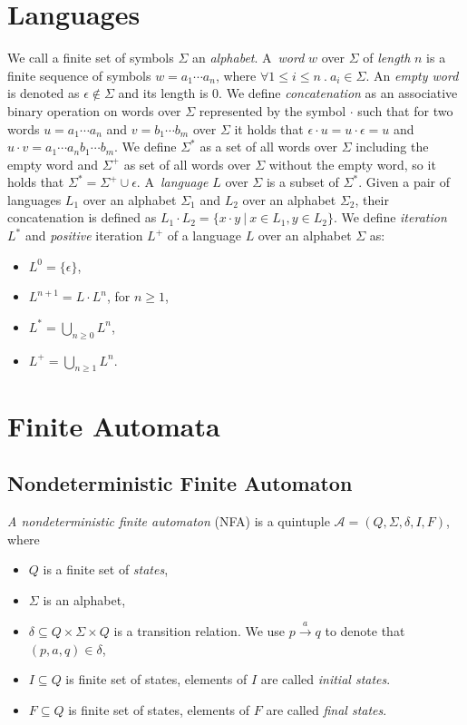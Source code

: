 \section{Languages}
We call a finite set of symbols $\Sigma$ an \emph{alphabet}. A~\emph{word} $w$ over $\Sigma$ of \emph{length} $n$ is a finite sequence of symbols 
$w=a_1\cdots a_n$, where $\forall 1 \leq i \leq n\ . \ a_i \in \Sigma$. An \emph{empty word} is denoted as $\epsilon \not\in\Sigma$ and its length is $0$. 
We define \emph{concatenation} as an associative binary operation on words over $\Sigma$ represented by the symbol $\cdot$ such that for two words 
$u=a_1\cdots a_n$
and $v=b_1\cdots b_m$ over $\Sigma$ it holds that $\epsilon\cdot u=u\cdot\epsilon=u$ and $u\cdot v=a_1 \cdots a_nb_1 \cdots b_m$.
We define $\Sigma^{*}$ as a set of all words over $\Sigma$ including the empty word and $\Sigma^{+}$ as set of 
all words over $\Sigma$ without the empty word, 
so it holds that $\Sigma^{*}=\Sigma^{+}\cup\epsilon$. A~\emph{language} $L$ over $\Sigma$ is a subset of $\Sigma^{*}$.
Given a pair of languages $L_1$ over an alphabet $\Sigma_{1}$ and $L_{2}$ over an alphabet $\Sigma_{2}$, their concatenation is defined as 
$L_1\cdot L_2=\{x\cdot y\ |\ x\in L_1, y\in L_2 \}$.
We define \emph{iteration} $L^{*}$ and \emph{positive} iteration $L^{+}$ of a language $L$ over an alphabet $\Sigma$ as:
	\begin{itemize}
		\item $L^0=\{\epsilon\}$,
		\item $L^{n+1}=L\cdot L^n$, for $n \geq 1$,
    \item $L^{*}=\bigcup_{n\geq 0} L^{n}$,
    \item $L^{+}=\bigcup_{n\geq 1} L^{n}$.
	\end{itemize}

\section{Finite Automata}
\label{defFA}

	\subsection{Nondeterministic Finite Automaton}
	\label{defNFA}
		\emph{A nondeterministic finite automaton} (NFA) is a quintuple $\mathcal{A}=(Q,\Sigma,\delta,I,F)$, where
		\begin{itemize}
			\item $Q$ is a finite set of \emph{states},
			\item $\Sigma$ is an alphabet,
			\item $\delta \subseteq Q \times \Sigma \times Q$ is a transition relation. We use $p \xrightarrow{a} q$ to denote that $(p,a,q)\in\delta$,
			\item $I\subseteq Q$ is finite set of states, elements of $I$ are called \emph{initial states}.
			\item $F\subseteq Q$ is finite set of states, elements of $F$ are called \emph{final states}.
		\end{itemize}

